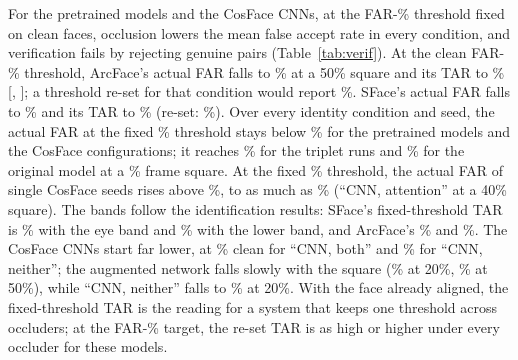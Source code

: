For the pretrained models and the CosFace CNNs, at the FAR-\% threshold fixed on clean faces, occlusion lowers the mean false accept rate in every condition, and verification fails by rejecting genuine pairs (Table~\ref{tab:verif}). At the clean FAR-\% threshold, ArcFace's actual FAR falls to \% at a 50\% square and its TAR to \% [, ]; a threshold re-set for that condition would report \%. SFace's actual FAR falls to \% and its TAR to \% (re-set: \%). Over every identity condition and seed, the actual FAR at the fixed \% threshold stays below \% for the pretrained models and the CosFace configurations; it reaches \% for the triplet runs and \% for the original model at a \% frame square. At the fixed \% threshold, the actual FAR of single CosFace seeds rises above \%, to as much as \% (``CNN, attention'' at a 40\% square). The bands follow the identification results: SFace's fixed-threshold TAR is \% with the eye band and \% with the lower band, and ArcFace's \% and \%. The CosFace CNNs start far lower, at \% clean for ``CNN, both'' and \% for ``CNN, neither''; the augmented network falls slowly with the square (\% at 20\%, \% at 50\%), while ``CNN, neither'' falls to \% at 20\%. With the face already aligned, the fixed-threshold TAR is the reading for a system that keeps one threshold across occluders; at the FAR-\% target, the re-set TAR is as high or higher under every occluder for these models.

\begin{table}[t]
\caption{Verification at a threshold fixed per model (per seed for the CNNs) on clean identity probes. TAR = true accept rate (\%) at the FAR-\% threshold, FAR = the actual false accept rate there (\%, mean over seeds), ``re-set'' = TAR with the threshold set on that condition's own impostors, TAR$_{0.1}$ = TAR at the fixed FAR-\% threshold. Trained CNNs are means of  seeds.}
\label{tab:verif}
\centering\small
\setlength{\tabcolsep}{3.5pt}

\end{table}
